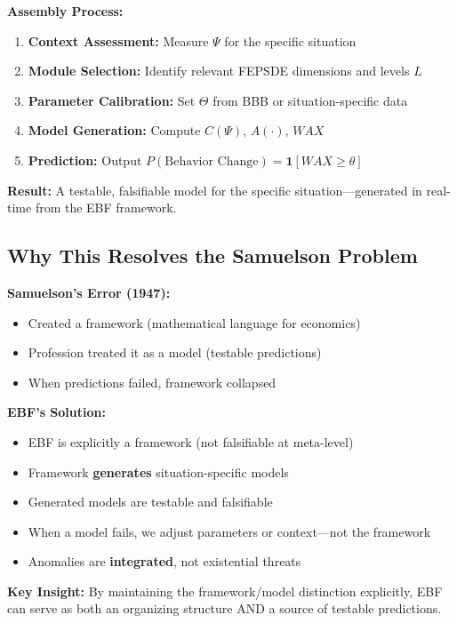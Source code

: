 \textbf{Assembly Process:}
\begin{enumerate}
    \item \textbf{Context Assessment:} Measure $\Psi$ for the specific situation
    \item \textbf{Module Selection:} Identify relevant FEPSDE dimensions and levels $L$
    \item \textbf{Parameter Calibration:} Set $\Theta$ from BBB or situation-specific data
    \item \textbf{Model Generation:} Compute $C(\Psi)$, $A(\cdot)$, $WAX$
    \item \textbf{Prediction:} Output $P(\text{Behavior Change}) = \mathbf{1}[WAX \geq \theta]$
\end{enumerate}

\textbf{Result:} A testable, falsifiable model for the specific situation---generated
in real-time from the EBF framework.

\subsection{Why This Resolves the Samuelson Problem}

\begin{tcolorbox}[colback=red!5!white, colframe=red!75!black,
    title=\textbf{The Resolution}]

\textbf{Samuelson's Error (1947):}
\begin{itemize}[nosep]
    \item Created a framework (mathematical language for economics)
    \item Profession treated it as a model (testable predictions)
    \item When predictions failed, framework collapsed
\end{itemize}

\textbf{EBF's Solution:}
\begin{itemize}[nosep]
    \item EBF is explicitly a framework (not falsifiable at meta-level)
    \item Framework \textbf{generates} situation-specific models
    \item Generated models are testable and falsifiable
    \item When a model fails, we adjust parameters or context---not the framework
    \item Anomalies are \textbf{integrated}, not existential threats
\end{itemize}

\textbf{Key Insight:} By maintaining the framework/model distinction explicitly,
EBF can serve as both an organizing structure AND a source of testable predictions.

\end{tcolorbox}


